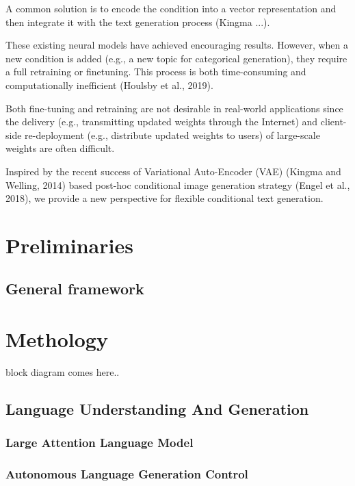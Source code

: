 \documentclass[11pt,a4paper]{article}
\begin{document}
A common solution is to encode the
condition into a vector representation and then integrate it with the text generation process (Kingma ...).

These existing neural models have achieved
encouraging results. However, when a new condition is added (e.g., a new topic for categorical
generation), they require a full retraining or finetuning. This process is both time-consuming and
computationally inefficient (Houlsby et al., 2019).

Both fine-tuning and retraining are not desirable
in real-world applications since the delivery (e.g.,
transmitting updated weights through the Internet)
and client-side re-deployment (e.g., distribute updated weights to users) of large-scale weights are
often difficult.

Inspired by the recent success of Variational
Auto-Encoder (VAE) (Kingma and Welling, 2014)
based post-hoc conditional image generation strategy (Engel et al., 2018), we provide a new perspective for flexible conditional text generation. 


\section{Preliminaries}
\subsection{General framework}

\section{Methology}
block diagram comes here..

\subsection{Language Understanding And Generation} %
  
\subsubsection{Large Attention Language Model} %

\subsubsection{Autonomous Language Generation Control} %
\end{document}

